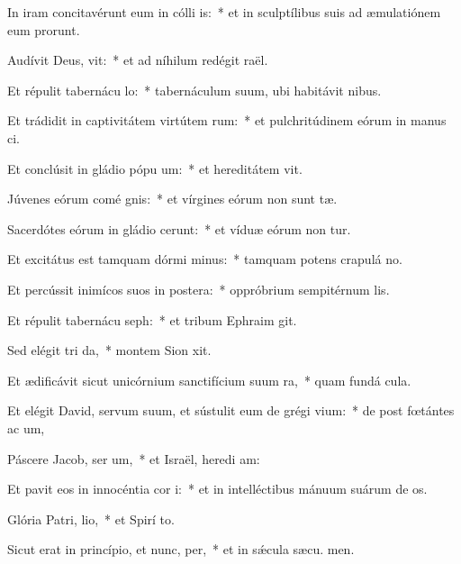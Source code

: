 \item In iram concitavérunt eum in cólli is:~* et in sculptílibus suis ad æmulatiónem eum prorunt.
\item Audívit Deus,  vit:~* et ad níhilum redégit  raël.
\item Et répulit tabernácu lo:~* tabernáculum suum, ubi habitávit  nibus.
\item Et trádidit in captivitátem virtútem rum:~* et pulchritúdinem eórum in manus ci.
\item Et conclúsit in gládio pópu um:~* et hereditátem  vit.
\item Júvenes eórum comé gnis:~* et vírgines eórum non sunt tæ.
\item Sacerdótes eórum in gládio cerunt:~* et víduæ eórum non tur.
\item Et excitátus est tamquam dórmi minus:~* tamquam potens crapulá  no.
\item Et percússit inimícos suos in postera:~* oppróbrium sempitérnum  lis.
\item Et répulit tabernácu seph:~* et tribum Ephraim  git.
\item Sed elégit tri da,~* montem Sion  xit.
\item Et ædificávit sicut unicórnium sanctifícium suum  ra,~* quam fundá  cula.
\item Et elégit David, servum suum, et sústulit eum de grégi vium:~* de post fœtántes ac um,
\item Páscere Jacob, ser um,~* et Israël, heredi am:
\item Et pavit eos in innocéntia cor i:~* et in intelléctibus mánuum suárum de os.
\item Glória Patri,  lio,~* et Spirí to.
\item Sicut erat in princípio, et nunc,  per,~* et in sǽcula sæcu. men.
